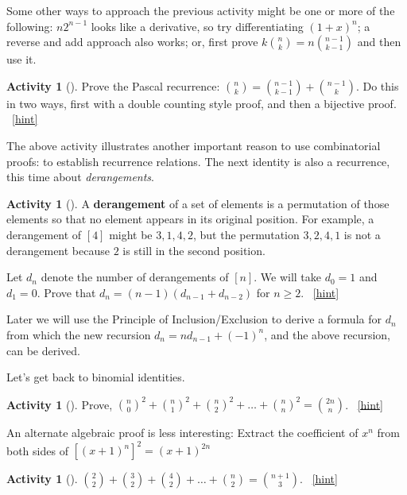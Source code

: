 \documentclass[10pt,]{book}
\newcommand{\terminology}[1]{\textbf{#1}}
\theoremstyle{plain}
\theoremstyle{definition}
\theoremstyle{definition}
\theoremstyle{definition}
\newtheorem{activity}[project]{Activity}
\numberwithin{equation}{chapter}
\begin{document}
\hypertarget{p-254}{}%
Some other ways to approach the previous activity might be one or more of the following: \(n2^{n - 1}\) looks like a derivative, so try differentiating \(\left( 1 + x \right)^{n}\); a reverse and add approach also works; or, first prove \(k \binom{n}{k} = n \binom{n - 1}{k - 1}\) and then use it.%
\begin{activity}[]\label{activity-37}
\hypertarget{p-255}{}%
Prove the Pascal recurrence: \(\binom{n}{k} = \binom{n - 1}{k-1} + \binom{n - 1}{k}\).  Do this in two ways, first with a double counting style proof, and then a bijective proof.%
~\hfill{\tiny\hyperlink{a-37}{[hint]}\hypertarget{q-37}{}}\end{activity}
\hypertarget{p-258}{}%
The above activity illustrates another important reason to use combinatorial proofs: to establish recurrence relations.  The next identity is also a recurrence, this time about \emph{derangements}.%
\begin{activity}[]\label{activity-38}
\hypertarget{p-259}{}%
A \terminology{derangement} of a set of elements is a permutation of those elements so that no element appears in its original position.  For example, a derangement of \([4]\) might be \(3,1,4,2\), but the permutation \(3,2,4,1\) is not a derangement because \(2\) is still in the second position.%
\par
\hypertarget{p-260}{}%
Let \(d_{n}\) denote the number of derangements of \([n]\).  We will take \(d_{0} = 1\) and \(d_{1} = 0\).  Prove that \(d_{n} = (n - 1)(d_{n - 1}+ d_{n - 2})\) for \(n \geq 2\).%
~\hfill{\tiny\hyperlink{a-38}{[hint]}\hypertarget{q-38}{}}\end{activity}
\hypertarget{p-263}{}%
Later we will use the Principle of Inclusion/Exclusion to derive a formula for \(d_{n}\) from which the new recursion \(d_{n} = nd_{n - 1} + \left( - 1 \right)^{n}\), and the above recursion, can be derived.%
\par
\hypertarget{p-264}{}%
Let's get back to binomial identities.%
\begin{activity}[]\label{activity-39}
\hypertarget{p-265}{}%
Prove, \(\binom{n}{0}^{2} + \binom{n}{1}^{2} + \binom{n}{2}^{2} + \ldots + \binom{n}{n}^{2} = \binom{2n}{n}\).%
~\hfill{\tiny\hyperlink{a-39}{[hint]}\hypertarget{q-39}{}}\end{activity}
\hypertarget{p-268}{}%
An alternate algebraic proof is less interesting: Extract the coefficient of \(x^{n}\) from both sides of \(\left\lbrack \left( x + 1 \right)^{n} \right\rbrack^{2} = \left(x + 1 \right)^{2n}\)%
\begin{activity}[]\label{activity-40}
\hypertarget{p-269}{}%
\(\binom{2}{2} + \binom{3}{2} + \binom{4}{2} + \ldots + \binom{n}{2} = \binom{n + 1}{3}\).%
~\hfill{\tiny\hyperlink{a-40}{[hint]}\hypertarget{q-40}{}}\end{activity}
\end{document}
